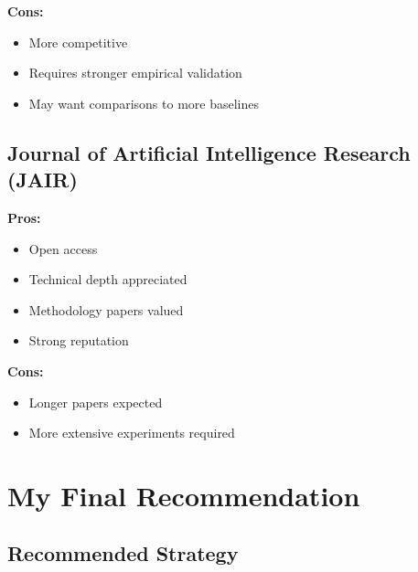 \documentclass[12pt]{article}
\begin{document}
\textbf{Cons:}
\begin{itemize}[leftmargin=*]
\item More competitive
\item Requires stronger empirical validation
\item May want comparisons to more baselines
\end{itemize}

\subsection{Journal of Artificial Intelligence Research (JAIR)}

\textbf{Pros:}
\begin{itemize}[leftmargin=*]
\item Open access
\item Technical depth appreciated
\item Methodology papers valued
\item Strong reputation
\end{itemize}

\textbf{Cons:}
\begin{itemize}[leftmargin=*]
\item Longer papers expected
\item More extensive experiments required
\end{itemize}

\section{My Final Recommendation}

\subsection{Recommended Strategy}
\end{document}

